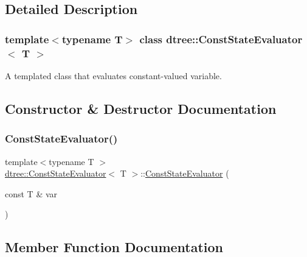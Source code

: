 \subsection{Detailed Description}
\subsubsection*{template$<$typename T$>$\newline
class dtree\+::\+Const\+State\+Evaluator$<$ T $>$}

A templated class that evaluates constant-\/valued variable. 



\subsection{Constructor \& Destructor Documentation}
\mbox{\label{classdtree_1_1_const_state_evaluator_a0f5769321b5312ed6d371ed157d25ff6}} 
\subsubsection{\texorpdfstring{ConstStateEvaluator()}{ConstStateEvaluator()}}
{\footnotesize\ttfamily template$<$typename T $>$ \\
\mbox{\hyperlink{classdtree_1_1_const_state_evaluator}{dtree\+::\+Const\+State\+Evaluator}}$<$ T $>$\+::\mbox{\hyperlink{classdtree_1_1_const_state_evaluator}{Const\+State\+Evaluator}} (\begin{DoxyParamCaption}\item[{const T \&}]{var }\end{DoxyParamCaption})\hspace{0.3cm}{\ttfamily [inline]}}



\subsection{Member Function Documentation}
\mbox{\label{classdtree_1_1_const_state_evaluator_aaa06b99c86b4390cfdcdcfc43f210eb6}} 
